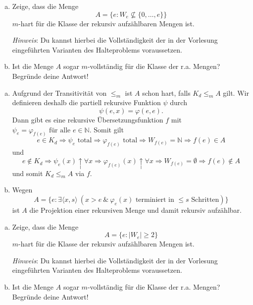 \documentclass[german,headsepline]{scrartcl}
\theoremstyle{definition}
\begin{document}
	\pagebreak
	\begin{question}[subtitle={Klausur 2009}]
		\begin{enumerate}[(a)]
			\item Zeige, dass die Menge
				\[A=\{e\colon W_e\not\subseteq\{0,\dots,e\}\}\]
				$m$-hart für die Klasse der rekursiv aufzählbaren Mengen ist.
				
				\textit{Hinweis}: Du kannst hierbei die Vollständigkeit
				der in der Vorlesung eingeführten Varianten des Halteproblems voraussetzen.
			\item Ist die Menge $A$ sogar $m$-vollständig für die Klasse der r.a. Mengen?
				Begründe deine Antwort!
		\end{enumerate}
	\end{question}
	\begin{solution}
		\begin{enumerate}[(a)]
			\item Aufgrund der Transitivität von $\leq_m$ ist $A$ schon hart, falls $K_d\leq_mA$ gilt.
				Wir definieren deshalb die partiell rekursive Funktion $\psi$ durch
				\[\psi(e,x)=\varphi(e,e).\]
				Dann gibt es eine rekursive Übersetzungsfunktion $f$ mit
				$\psi_e=\varphi_{f(e)}\text{ für alle }e\in\mathbb{N}$.
				Somit gilt
				\[e\in K_d\Rightarrow\psi_e\text{ total}\Rightarrow\varphi_{f(e)}\text{ total}
				\Rightarrow W_{f(e)}=\mathbb{N}\Rightarrow f(e)\in A\]
				und
				\[e\notin K_d\Rightarrow\psi_e(x)\uparrow\forall x\Rightarrow\varphi_{f(e)}(x)\uparrow\forall x
				\Rightarrow W_{f(e)}=\emptyset\Rightarrow f(e)\notin A\]
				und somit $K_d\leq_mA$ via $f$.
			\item Wegen
				\[A=\{e\colon\exists\langle x,s\rangle~(x>e~\&~\varphi_e(x)\text{ terminiert in $\leq s$ Schritten})\}\]
				ist $A$ die Projektion einer rekursiven Menge und damit rekursiv aufzählbar.
		\end{enumerate}
	\end{solution}
	
	\begin{question}[subtitle={Klausur 2009}]
		\begin{enumerate}[(a)]
			\item Zeige, dass die Menge
				\[A=\{e\colon\vert W_e\vert\geq2\}\]
				$m$-hart für die Klasse der rekursiv aufzählbaren Mengen ist.
			
				\textit{Hinweis}: Du kannst hierbei die Vollständigkeit der in der Vorlesung eingeführten Varianten des Halteproblems voraussetzen.
			\item Ist die Menge $A$ sogar $m$-vollständig für die Klasse der r.a. Mengen? Begründe deine Antwort!
		\end{enumerate}
	\end{question}
	
\end{document}
